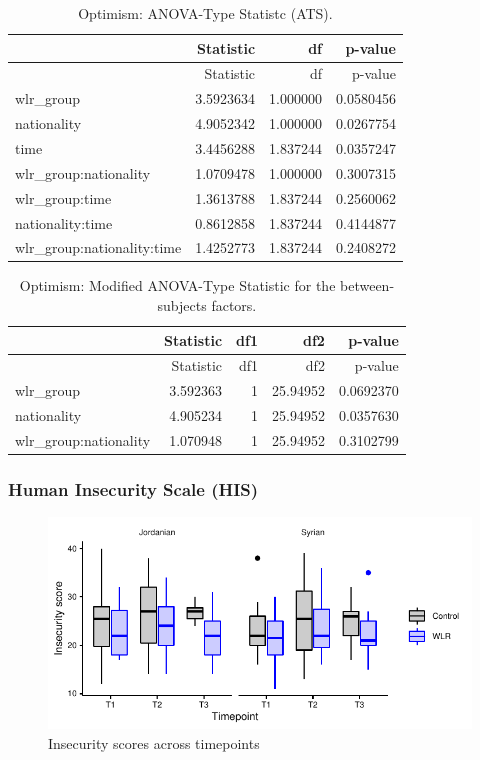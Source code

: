 \documentclass[]{article}
\begin{document}
\begin{longtable}[]{@{}lrrr@{}}
\caption{Optimism: ANOVA-Type Statistc (ATS).}\tabularnewline
\toprule
& Statistic & df & p-value\tabularnewline
\midrule
\endfirsthead
\toprule
& Statistic & df & p-value\tabularnewline
\midrule
\endhead
wlr\_group & 3.5923634 & 1.000000 & 0.0580456\tabularnewline
nationality & 4.9052342 & 1.000000 & 0.0267754\tabularnewline
time & 3.4456288 & 1.837244 & 0.0357247\tabularnewline
wlr\_group:nationality & 1.0709478 & 1.000000 & 0.3007315\tabularnewline
wlr\_group:time & 1.3613788 & 1.837244 & 0.2560062\tabularnewline
nationality:time & 0.8612858 & 1.837244 & 0.4144877\tabularnewline
wlr\_group:nationality:time & 1.4252773 & 1.837244 &
0.2408272\tabularnewline
\bottomrule
\end{longtable}

\begin{longtable}[]{@{}lrrrr@{}}
\caption{Optimism: Modified ANOVA-Type Statistic for the
between-subjects factors.}\tabularnewline
\toprule
& Statistic & df1 & df2 & p-value\tabularnewline
\midrule
\endfirsthead
\toprule
& Statistic & df1 & df2 & p-value\tabularnewline
\midrule
\endhead
wlr\_group & 3.592363 & 1 & 25.94952 & 0.0692370\tabularnewline
nationality & 4.905234 & 1 & 25.94952 & 0.0357630\tabularnewline
wlr\_group:nationality & 1.070948 & 1 & 25.94952 &
0.3102799\tabularnewline
\bottomrule
\end{longtable}

\newpage

\hypertarget{human-insecurity-scale-his}{%
\subsubsection{Human Insecurity Scale
(HIS)}\label{human-insecurity-scale-his}}

\begin{figure}[H]

{\centering \includegraphics{WLR-analyses-report_files/figure-latex/unnamed-chunk-19-1} 

}

\caption{Insecurity scores across timepoints}\label{fig:unnamed-chunk-19}
\end{figure}
\end{document}
